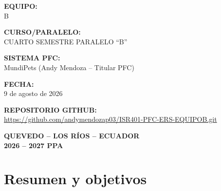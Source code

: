 \documentclass[journal,onecolumn]{IEEEtran}
\begin{document}
\begin{titlepage}
		\vspace{0.5cm}
		
		{\normalsize\bfseries EQUIPO:}\\[4pt]
		{\normalsize B}
		
		\vspace{0.5cm}
		
		{\normalsize\bfseries CURSO/PARALELO:}\\[4pt]
		{\normalsize CUARTO SEMESTRE PARALELO ``B''}
		
		\vspace{0.5cm}
		
		{\normalsize\bfseries SISTEMA PFC:}\\[4pt]
		{\normalsize MundiPets (Andy Mendoza -- Titular PFC)}
		
		\vspace{0.5cm}
		
		{\normalsize\bfseries FECHA:}\\[4pt]
		{\normalsize 9 de agosto de 2026}
		
		\vspace{0.5cm}
		
		\textbf{REPOSITORIO GITHUB:}\\[4pt]
		\url{https://github.com/andymendozap03/ISR401-PFC-ERS-EQUIPOB.git}
		
		\vspace{0.75cm}
		
		{\normalsize\bfseries QUEVEDO -- LOS RÍOS -- ECUADOR}\\[4pt]
		{\normalsize\bfseries 2026 -- 2027 PPA}
		
	\end{titlepage}
	
	
	\newpage
	\tableofcontents
	\newpage
	
	\section{Resumen y objetivos}
	
\end{document}
